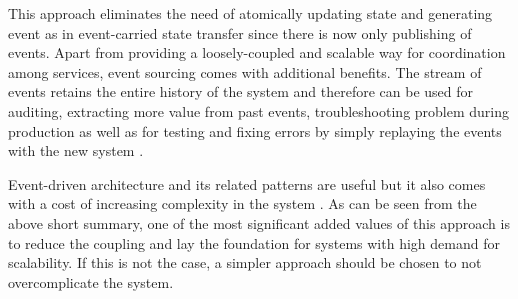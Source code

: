This approach eliminates the need of atomically updating state and generating event as in event-carried state transfer since there is now only publishing of events. Apart from providing a loosely-coupled and scalable way for coordination among services, event sourcing comes with additional benefits. The stream of events retains the entire history of the system and therefore can be used for auditing, extracting more value from past events, troubleshooting problem during production as well as for testing and fixing errors by simply replaying the events with the new system \cite{betts2013exploring}. 




Event-driven architecture and its related patterns are useful but it also comes with a cost of increasing complexity in the system \cite{eventsourcingishard1} \cite{eventsourcingishard2}. As can be seen from the above short summary, one of the most significant added values of this approach is to reduce the coupling and lay the foundation for systems with high demand for scalability. If this is not the case, a simpler approach should be chosen to not overcomplicate the system.




